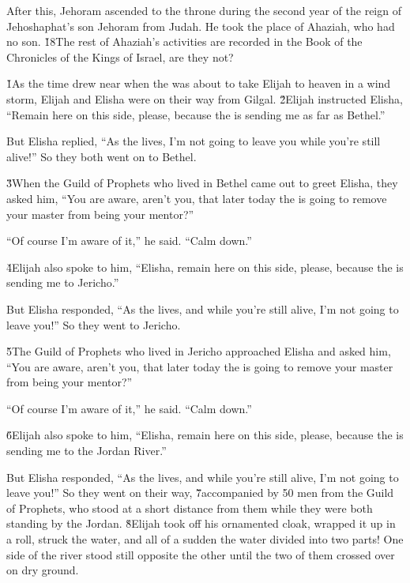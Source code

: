 After this, Jehoram ascended to the throne during the second year of the reign of Jehoshaphat's son Jehoram from Judah. He took the place of Ahaziah, who had no son. \v{18}The rest of Ahaziah's activities are recorded in the Book of the Chronicles of the Kings of Israel, are they not?

\v{1}As the time drew near when the  was about to take Elijah to heaven in a wind storm, Elijah and Elisha were on their way from Gilgal. \v{2}Elijah instructed Elisha, ``Remain here on this side, please, because the  is sending me as far as Bethel.''

But Elisha replied, ``As the  lives, I'm not going to leave you while you're still alive!'' So they both went on to Bethel.

\v{3}When the Guild of Prophets who lived in Bethel came out to greet Elisha, they asked him, ``You are aware, aren't you, that later today the  is going to remove your master from being your mentor?''

``Of course I'm aware of it,'' he said. ``Calm down.''

\v{4}Elijah also spoke to him, ``Elisha, remain here on this side, please, because the  is sending me to Jericho.''

But Elisha responded, ``As the  lives, and while you're still alive, I'm not going to leave you!'' So they went to Jericho.

\v{5}The Guild of Prophets who lived in Jericho approached Elisha and asked him, ``You are aware, aren't you, that later today the  is going to remove your master from being your mentor?''

``Of course I'm aware of it,'' he said. ``Calm down.''

\v{6}Elijah also spoke to him, ``Elisha, remain here on this side, please, because the  is sending me to the Jordan River.''

But Elisha responded, ``As the  lives, and while you're still alive, I'm not going to leave you!'' So they went on their way, \v{7}accompanied by 50 men from the Guild of Prophets, who stood at a short distance from them while they were both standing by the Jordan. \v{8}Elijah took off his ornamented cloak, wrapped it up in a roll, struck the water, and all of a sudden the water divided into two parts! One side of the river stood still opposite the other until the two of them crossed over on dry ground.

